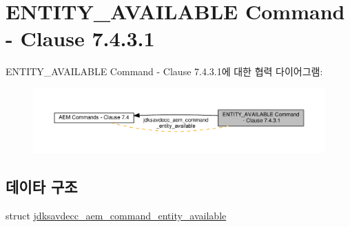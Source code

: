\hypertarget{group__command__entity__available}{}\section{E\+N\+T\+I\+T\+Y\+\_\+\+A\+V\+A\+I\+L\+A\+B\+LE Command -\/ Clause 7.4.3.1}
\label{group__command__entity__available}
E\+N\+T\+I\+T\+Y\+\_\+\+A\+V\+A\+I\+L\+A\+B\+LE Command -\/ Clause 7.4.3.1에 대한 협력 다이어그램\+:
\nopagebreak
\begin{figure}[H]
\begin{center}
\leavevmode
\includegraphics[width=350pt]{group__command__entity__available}
\end{center}
\end{figure}
\subsection*{데이타 구조}
\begin{DoxyCompactItemize}
\item 
struct \hyperlink{structjdksavdecc__aem__command__entity__available}{jdksavdecc\+\_\+aem\+\_\+command\+\_\+entity\+\_\+available}
\end{DoxyCompactItemize}
